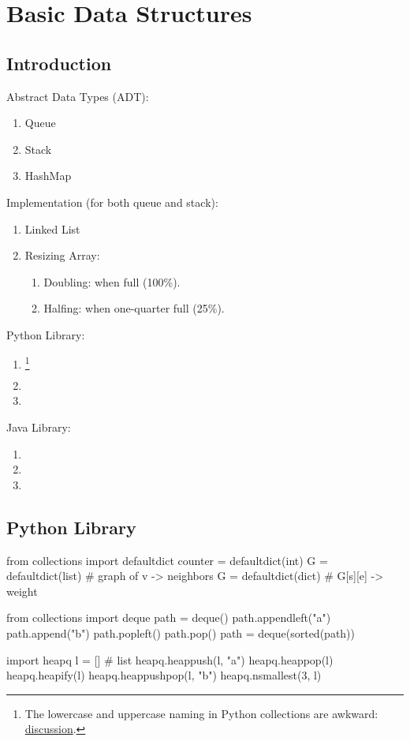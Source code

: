 \chapter{Basic Data  Structures}


\section{Introduction}
Abstract Data Types (ADT):
\begin{enumerate}
\item Queue
\item Stack
\item HashMap
\end{enumerate}
Implementation (for both queue and stack):
\begin{enumerate}
\item Linked List
\item Resizing Array:
\begin{enumerate}
\item Doubling: when full (100\%).
\item Halfing: when one-quarter full (25\%). 
\end{enumerate}
\end{enumerate}
Python Library:
\begin{enumerate}
\item {} \footnote{The lowercase and uppercase naming in Python collections are awkward: \href{http://stackoverflow.com/questions/18953681/naming-convention-in-collections-why-are-some-lowercase-and-others-capwords}{discussion}.}
\item {}
\item {}
\end{enumerate}
Java Library:
\begin{enumerate}
\item {}
\item {}
\item {}
\end{enumerate}

\section{Python Library}
\begin{python}
from collections import defaultdict
counter = defaultdict(int)
G = defaultdict(list)  # graph of v -> neighbors
G = defaultdict(dict)  # G[s][e] -> weight


from collections import deque
path = deque()
path.appendleft("a")
path.append("b")
path.popleft()
path.pop()
path = deque(sorted(path))


import heapq
l = []  # list 
heapq.heappush(l, "a")
heapq.heappop(l)
heapq.heapify(l)
heapq.heappushpop(l, "b")
heapq.nsmallest(3, l)
\end{python}

